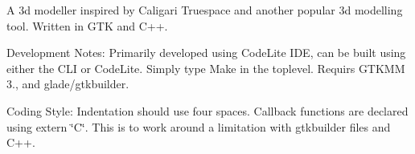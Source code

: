 A 3d modeller inspired by Caligari Truespace and another popular 3d modelling tool. Written in G\+TK and C++.



Development Notes\+: Primarily developed using Code\+Lite I\+DE, can be built using either the C\+LI or Code\+Lite. Simply type Make in the toplevel. Requirs G\+T\+K\+MM 3., and glade/gtkbuilder.

Coding Style\+: Indentation should use four spaces. Callback functions are declared using extern \char`\"{}\+C\char`\"{}. This is to work around a limitation with gtkbuilder files and C++. 